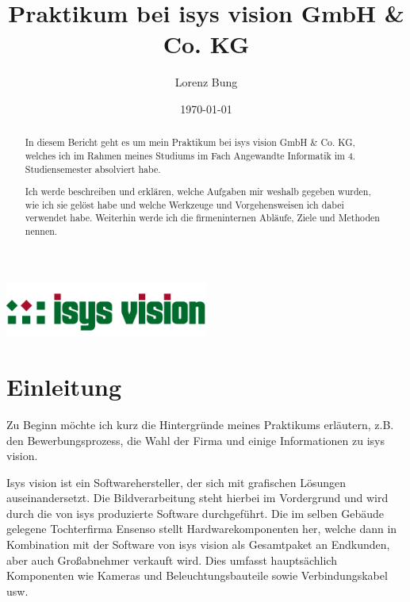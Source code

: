 \documentclass[xcolor=dvipsnames,11pt,paper=a4paper]{report}
\title{\huge\textbf{Praktikum bei isys vision GmbH \& Co. KG}}
\author{Lorenz Bung}
\date{\today}
\begin{document}

\begin{titlepage}
\raggedright\includegraphics[width=0.5\textwidth]{media/isys.png}
{\let\newpage\relax\maketitle}
\end{titlepage}

\begin{abstract}
In diesem Bericht geht es um mein Praktikum bei isys vision GmbH \& Co. KG, welches
ich im Rahmen meines Studiums im Fach Angewandte Informatik im 4. Studiensemester
absolviert habe.

Ich werde beschreiben und erklären, welche Aufgaben mir weshalb gegeben wurden,
wie ich sie gelöst habe und welche Werkzeuge und Vorgehensweisen ich dabei verwendet
habe. Weiterhin werde ich die firmeninternen Abläufe, Ziele und Methoden nennen.
\end{abstract}

\tableofcontents
\pagebreak

\begingroup
\let\clearpage\relax
\lstlistoflistings
\listoffigures
\listoftables
\endgroup
\pagebreak

\setcounter{chapter}{-1}
\chapter{Einleitung}

Zu Beginn möchte ich kurz die Hintergründe meines Praktikums erläutern,
z.B. den Bewerbungsprozess, die Wahl der Firma und einige Informationen zu isys
vision.

Isys vision ist ein Softwarehersteller, der sich mit grafischen Lösungen auseinandersetzt.
Die Bildverarbeitung steht hierbei im Vordergrund und wird durch die von isys produzierte
Software durchgeführt. Die im selben Gebäude gelegene Tochterfirma Ensenso stellt
Hardwarekomponenten her, welche dann in Kombination mit der Software von isys vision
als Gesamtpaket an Endkunden, aber auch Großabnehmer verkauft wird. Dies umfasst
hauptsächlich Komponenten wie Kameras und Beleuchtungsbauteile sowie Verbindungskabel
usw.
\end{document}
